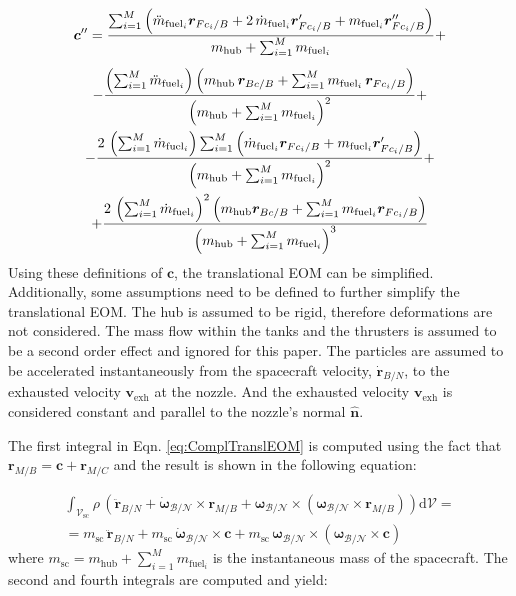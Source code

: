 \begin{multline}\label{eq:eq18}
	\bm{c}'' = \frac{\sum_{i=1}^{M}\left(\ddot{m}_{\text{fuel}_i}\bm{r}_{Fc_i/B} +2\,\dot{m}_{\text{fuel}_i}\bm{r}'_{Fc_i/B}+ m_{\text{fuel}_i}\bm{r}''_{Fc_i/B}\right)}{m_{\text{hub}}+ \sum_{i=1}^{M}m_{\text{fuel}_i}} + \vspace{5pt}\\
	- \frac{\left(\sum_{i=1}^{M}\ddot{m}_{\text{fuel}_i}\right)\left(m_{\text{hub}}\,\bm{r}_{Bc/B} + \sum_{i=1}^{M}m_{\text{fuel}_i}\,\bm{r}_{Fc_i/B}\right)  }{\left(m_{\text{hub}}+ \sum_{i=1}^{M}m_{\text{fuel}_i}\right)^2} +\\-
	\frac{2\,\left(\sum_{i=1}^{M}\dot{m}_{\text{fuel}_i}\right)\sum_{i=1}^{M}\left(\dot{m}_{\text{fuel}_i}\bm{r}_{Fc_i/B} + m_{\text{fuel}_i}\bm{r}'_{Fc_i/B}\right) }{\left(m_{\text{hub}}+ \sum_{i=1}^{M}m_{\text{fuel}_i}\right)^2} +\\
	+ \frac{2\,\left(\sum_{i=1}^{M}\dot{m}_{\text{fuel}_i}\right)^2\left(m_{\text{hub}}\bm{r}_{Bc/B} +\sum_{i=1}^{M} m_{\text{fuel}_i}\bm{r}_{Fc_i/B}\right)}{\left(m_{\text{hub}}+ \sum_{i=1}^{M}m_{\text{fuel}_i}\right)^3}
\end{multline}
Using these definitions of $\bm c$, the translational EOM can be simplified. Additionally, some assumptions need to be defined to further simplify the translational EOM. The hub is assumed to be rigid, therefore deformations are not considered. The mass flow within the tanks and the thrusters is assumed to be a second order effect and ignored for this paper. The particles are assumed to be accelerated instantaneously from the spacecraft velocity, $\dot{\bm{r}}_{B/N}$, to the exhausted velocity $\bm{v}_{\text{exh}}$ at the nozzle. And the exhausted velocity $\bm{v}_{\text{exh}}$ is considered constant and parallel to the nozzle's normal $\hat{\bm{n}}$.

The first integral in Eqn. \eqref{eq:ComplTranslEOM} is computed using the fact that $\bm{r}_{M/B} = \bm{c} + \bm{r}_{M/C}$ and the result is shown in the following equation:

\begin{multline}\label{eq:eq19}
	\int_{\mathcal{V}_{\text{sc}}}\rho\,\left(\ddot{\bm{r}}_{B/N} + \dot{\bm{\omega}}_{\mathcal{B}/\mathcal{N}}\times\bm{r}_{M/B} + \bm{\omega}_{\mathcal{B}/\mathcal{N}} \times\left(\bm{\omega}_{\mathcal{B}/\mathcal{N}} \times\bm{r}_{M/B}\right)\right)\text{d}\mathcal{V} = \\=
	m_{\text{sc}} \,\bm{\ddot{r}}_{B/N} + m_{\text{sc}}\,\bm{\dot{\omega}}_{\mathcal{B}/\mathcal{N}} \times\bm{c} + m_{\text{sc}}\,\bm{\omega}_{\mathcal{B}/\mathcal{N}} \times\left(\bm{\omega}_{\mathcal{B}/\mathcal{N}}\times\bm{c}\right) 
\end{multline}
\noindent 
where $m_{\text{sc}}=m_{\text{hub}}+ \sum_{i=1}^{M}m_{\text{fuel}_i}$ is the instantaneous mass of the spacecraft. The second and fourth integrals are computed and yield:

